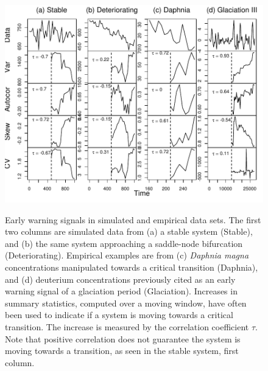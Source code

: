 \documentclass[authoryear,preprint,11pt]{elsarticle}
\begin{document}
 \begin{figure}[h]
   \begin{center}
     \includegraphics[width=\linewidth]{Fig2}
     \label{fig:summary_stats}
     \caption{Early warning signals in simulated and empirical data sets.  The first two columns are simulated data from (a) a stable system (Stable), and (b) the same system approaching a saddle-node bifurcation (Deteriorating).  Empirical examples are from (c) \emph{Daphnia magna} concentrations manipulated towards a critical transition (Daphnia), and (d) deuterium concentrations previously cited as an early warning signal of a glaciation period (Glaciation). Increases in summary statistics, computed over a moving window, have often been used to indicate if a system is moving towards a critical transition.  The increase is measured by the correlation coefficient $\tau$.  Note that positive correlation does not guarantee the system is moving towards a transition, as seen in the stable system, first column.}
  \end{center}
 \end{figure}
\end{document}

